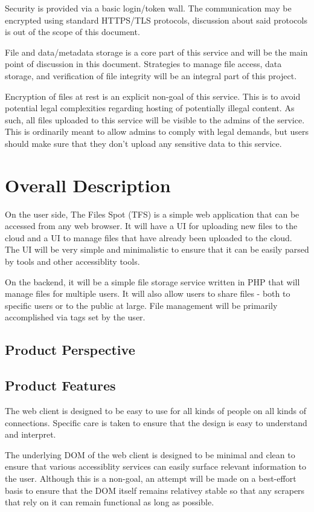 \documentclass[12pt,a4paper]{report}
\begin{document}
Security is provided via a basic login/token wall. The communication may be encrypted using standard HTTPS/TLS protocols, discussion about said protocols is out of the scope of this document.

File and data/metadata storage is a core part of this service and will be the main point of discussion in this document. Strategies to manage file access, data storage, and verification of file integrity will be an integral part of this project.

Encryption of files at rest is an explicit non-goal of this service. This is to avoid potential legal complexities regarding hosting of potentially illegal content. As such, all files uploaded to this service will be visible to the admins of the service. This is ordinarily meant to allow admins to comply with legal demands, but users should make sure that they don't upload any sensitive data to this service.

\section{Overall Description} \label{sec:overall_description}
On the user side, The Files Spot (TFS) is a simple web application that can be accessed from any web browser. It will have a UI for uploading new files to the cloud and a UI to manage files that have already been uploaded to the cloud. The UI will be very simple and minimalistic to ensure that it can be easily parsed by tools and other accessiblity tools.

On the backend, it will be a simple file storage service written in PHP that will manage files for multiple users. It will also allow users to share files - both to specific users or to the public at large. File management will be primarily accomplished via tags set by the user.

\subsection{Product Perspective}
\subsection{Product Features}
The web client is designed to be easy to use for all kinds of people on all kinds of connections. Specific care is taken to ensure that the design is easy to understand and interpret.

The underlying DOM of the web client is designed to be minimal and clean to ensure that various accessiblity services can easily surface relevant information to the user. Although this is a non-goal, an attempt will be made on a best-effort basis to ensure that the DOM itself remains relativey stable so that any scrapers that rely on it can remain functional as long as possible.
\end{document}
